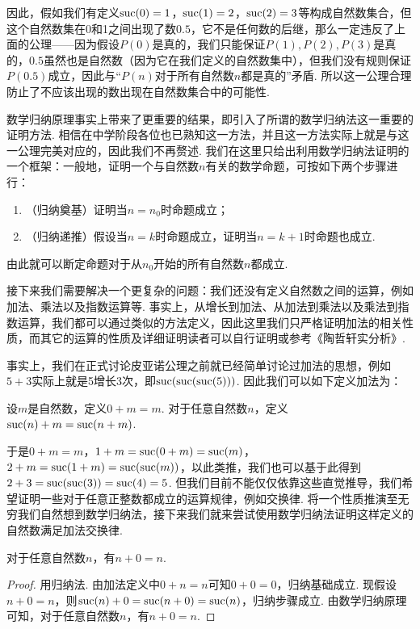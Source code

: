 因此，假如我们有定义$\operatorname{suc}(0)=1$，$\operatorname{suc}(1)=2$，$\operatorname{suc}(2)=3$等构成自然数集合，但这个自然数集在0和1之间出现了数$0.5$，它不是任何数的后继，那么一定违反了上面的公理——因为假设$P(0)$是真的，我们只能保证$P(1),P(2),P(3)$是真的，$0.5$虽然也是自然数（因为它在我们定义的自然数集中），但我们没有规则保证$P(0.5)$成立，因此与``$P(n)$对于所有自然数$n$都是真的''矛盾. 所以这一公理合理防止了不应该出现的数出现在自然数集合中的可能性.

数学归纳原理事实上带来了更重要的结果，即引入了所谓的数学归纳法这一重要的证明方法. 相信在中学阶段各位也已熟知这一方法，并且这一方法实际上就是与这一公理完美对应的，因此我们不再赘述. 我们在这里只给出利用数学归纳法证明的一个框架：一般地，证明一个与自然数$n$有关的数学命题，可按如下两个步骤进行：
\begin{enumerate}
    \item（归纳奠基）证明当$n=n_0$时命题成立；

    \item（归纳递推）假设当$n=k$时命题成立，证明当$n=k+1$时命题也成立.
\end{enumerate}
由此就可以断定命题对于从$n_0$开始的所有自然数$n$都成立.

接下来我们需要解决一个更复杂的问题：我们还没有定义自然数之间的运算，例如加法、乘法以及指数运算等. 事实上，从增长到加法、从加法到乘法以及乘法到指数运算，我们都可以通过类似的方法定义，因此这里我们只严格证明加法的相关性质，而其它的运算的性质及详细证明读者可以自行证明或参考《陶哲轩实分析》.

事实上，我们在正式讨论皮亚诺公理之前就已经简单讨论过加法的思想，例如$5+3$实际上就是5增长3次，即$\operatorname{suc}(\operatorname{suc}(\operatorname{suc}(5)))$. 因此我们可以如下定义加法为：

\begin{definition}{}{}
    设$m$是自然数，定义$0+m=m$. 对于任意自然数$n$，定义$\operatorname{suc}(n)+m=\operatorname{suc}(n+m)$.
\end{definition}

于是$0+m=m$，$1+m=\operatorname{suc}(0+m)=\operatorname{suc}(m)$，$2+m=\operatorname{suc}(1+m)=\operatorname{suc}(\operatorname{suc}(m))$，以此类推，我们也可以基于此得到$2+3=\operatorname{suc}(\operatorname{suc}(3))=\operatorname{suc}(4)=5$. 但我们目前不能仅仅依靠这些直觉推导，我们希望证明一些对于任意正整数都成立的运算规律，例如交换律. 将一个性质推演至无穷我们自然想到数学归纳法，接下来我们就来尝试使用数学归纳法证明这样定义的自然数满足加法交换律.

\begin{lemma}{}{}
    对于任意自然数$n$，有$n+0=n$.
\end{lemma}
\begin{proof}
    用归纳法. 由加法定义中$0+n=n$可知$0+0=0$，归纳基础成立. 现假设$n+0=n$，则$\operatorname{suc}(n)+0=\operatorname{suc}(n+0)=\operatorname{suc}(n)$，归纳步骤成立. 由数学归纳原理可知，对于任意自然数$n$，有$n+0=n$.
\end{proof}

